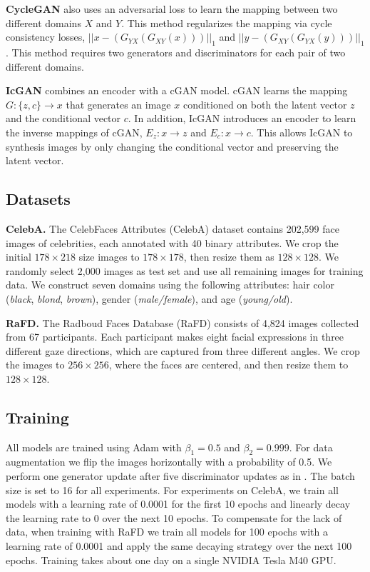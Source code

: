  \textbf{CycleGAN} also uses an adversarial loss to learn the mapping between two different domains $X$ and $Y$. This method regularizes the mapping via cycle consistency losses, ${||x - ({G}_{YX}({G}_{XY}(x)))||}_{1} $ and ${||y - ({G}_{XY}({G}_{YX}(y)))||}_{1}$. This method requires two generators and discriminators for each pair of two different domains.
\medskip

 \textbf{IcGAN} combines an encoder with a cGAN \cite{odena2016conditional} model. cGAN learns the mapping $G: \{z, c\} \rightarrow x$ that generates an image $x$ conditioned on both the latent vector $z$ and the conditional vector $c$. In addition, IcGAN introduces an encoder to learn the inverse mappings of cGAN, ${E}_{z}: x \rightarrow z$ and ${E}_{c}: x \rightarrow c$. This allows IcGAN to synthesis images by only changing the conditional vector and preserving the latent vector.

\medskip

\subsection{Datasets}
 \textbf{CelebA.} The CelebFaces Attributes (CelebA) dataset \cite{liu2015faceattributes} contains 202,599 face images of celebrities, each annotated with 40 binary attributes. We crop the initial $178 \times 218$ size images to $178 \times 178$, then resize them as $128 \times 128$. We randomly select 2,000 images as test set and use all remaining images for training data. We construct seven domains using the following attributes: hair color (\textit{black}, \textit{blond}, \textit{brown}), gender (\textit{male/female}), and age (\textit{young/old}). 

\medskip

 \textbf{RaFD.} The Radboud Faces Database (RaFD) \cite{langner2010presentation} consists of 4,824 images collected from 67 participants. Each participant makes eight facial expressions in three different gaze directions, which are captured from three different angles. We crop the images to $256 \times 256$,  where the faces are centered, and then resize them to $128 \times 128$. 

\medskip

\subsection{Training}
All models are trained using Adam \cite{kingma2014adam} with ${\beta}_{1}=0.5$ and ${\beta}_{2}=0.999$. For data augmentation we flip the images horizontally with a probability of 0.5. We perform one generator update after five discriminator updates as in \cite{gulrajani2017improved}. The batch size is set to 16 for all experiments. For experiments on CelebA,  we train all models with a learning rate of 0.0001 for the first 10 epochs and linearly decay the learning rate to 0 over the next 10 epochs. To compensate for the lack of data, when training with RaFD we train all models for 100 epochs with a learning rate of 0.0001 and apply the same decaying strategy over the next 100 epochs. Training takes about one day on a single NVIDIA Tesla M40 GPU. 

